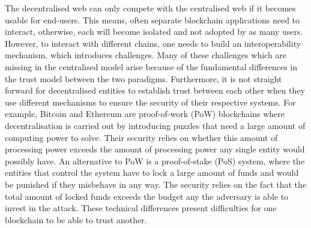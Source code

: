 The decentralised web can only compete with the centralised web if it becomes usable for end-users. This means, often separate blockchain applications need to interact, otherwise, each will become isolated and not adopted by as many users. However, to interact with different chains, one needs to build an interoperability mechanism, which introduces challenges. Many of these challenges which are missing in the centralised model arise because of the fundamental differences in the trust model between the two paradigms. 
Furthermore, it is not straight forward for decentralised entities to establish trust between each other when they use different mechanisms to ensure the security of their respective systems. For example, Bitcoin\cite{nakamoto2008bitcoin} and Ethereum\cite{buterin2014ethereum} are proof-of-work (PoW) blockchains where decentralisation is carried out by introducing puzzles that need a large amount of computing power to solve. Their security relies on whether this amount of processing power exceeds the amount of processing power any single entity would possibly have. An alternative to PoW is a proof-of-stake (PoS) system, where the entities that control the system have to lock a large amount of funds and would be punished if they misbehave in any way. The security relies on the fact that the total amount of locked funds exceeds the budget any the adversary is able to invest in the attack. These technical differences present difficulties for one blockchain to be able to trust another.

